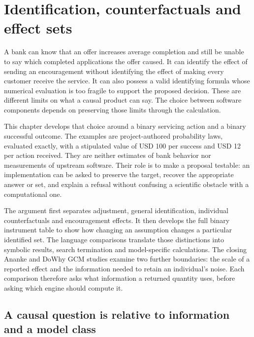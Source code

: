 \chapter{Identification, counterfactuals and effect sets}
\label{exec17:s3}

A bank can know that an offer increases average completion and still be unable
to say which completed applications the offer caused. It can identify the
effect of sending an encouragement without identifying the effect of making
every customer receive the service. It can also possess a valid identifying
formula whose numerical evaluation is too fragile to support the proposed
decision. These are different limits on what a causal product can say. The
choice between software components depends on preserving those limits through
the calculation.

This chapter develops that choice around a binary servicing action and a
binary successful outcome. The examples are project-authored probability
laws, evaluated exactly, with a stipulated value of USD 100 per success and
USD 12 per action received. They are neither estimates of bank behavior nor
measurements of upstream software. Their role is to make a proposal testable:
an implementation can be asked to preserve the target, recover the
appropriate answer or set, and explain a refusal without confusing a
scientific obstacle with a computational one.~\citep{exec17_s3_exact}

The argument first separates adjustment, general identification, individual
counterfactuals and encouragement effects. It then develops the full binary
instrument table to show how changing an assumption changes a particular
identified set. The language comparisons translate those distinctions into
symbolic results, search termination and model-specific calculations. The
closing Ananke and DoWhy GCM studies examine two further boundaries: the
scale of a reported effect and the information needed to retain an
individual's noise. Each comparison therefore asks what information a
returned quantity uses, before asking which engine should compute it.

\section{A causal question is relative to information and a model class}
\label{exec17:s3-target}

